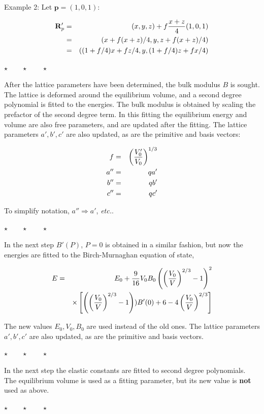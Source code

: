\documentclass[a4paper,12pt,onecolumn]{article}
\makeatletter
\newcommand{\etc}{\emph{etc.\@\xspace}}
\def\R{\mathbf{R}}
\def\p{\mathbf{p}}
\newcommand{\stars}{\begin{center} \vspace{0.5cm}$\star \qquad \star \qquad \star$\vspace{0.5cm}\end{center}}
\makeatother
\begin{document}
Example 2: Let $\p = (1,0,1)$:

\begin{eqnarray}
\R'_p &=&  (x,y,z) + f {x + z \over 4} (1, 0, 1) \\
  &=& (x + f(x+z)/4, y, z + f(x+z)/4) \\
  &=& ((1+f/4)x + fz/4, y, (1+f/4)z + fx/4)
\end{eqnarray}


\stars


After the lattice parameters have been determined, the bulk modulus $B$ is sought.
The lattice is deformed around the equilibrium volume, and a second degree
polynomial is fitted to the energies. The bulk modulus is obtained by
scaling the prefactor of the second degree term. In this fitting the
equilibrium energy and volume are also free parameters, and are updated
after the fitting. The lattice parameters $a', b', c'$ are also updated,
as are the primitive and basis vectors:

\begin{eqnarray}
f &=& \left( {V'_0 \over V_0} \right)^{1/3} \\
a'' &=& q a' \\
b'' &=& q b' \\
c'' &=& q c'
\end{eqnarray}

To simplify notation, $a'' \Rightarrow a'$, \etc.

\stars

In the next step $B'(P)$, $P=0$ is obtained in a similar fashion, but now the
energies are fitted to the Birch-Murnaghan equation of state,

\begin{eqnarray}
E &=& E_0 + {9 \over 16} V_0 B_0 \left( \left({V_0 \over V}\right)^{2/3} - 1 \right)^2 \nonumber \\
  & & \times 
\left[
\left( \left({V_0 \over V}\right)^{2/3} - 1 \right)) B'(0)
+ 6 - 4 \left({V_0 \over V}\right)^{2/3}
\right]
\end{eqnarray}

The new values $E_0, V_0, B_0$ are used instead of the old ones.
The lattice parameters $a', b', c'$ are also updated, as are the
primitive and basis vectors.


\stars


In the next step the elastic constants are fitted to second degree
polynomials. The equilibrium volume is used as a fitting parameter,
but its new value is \textbf{not} used as above.


\stars
\end{document}
